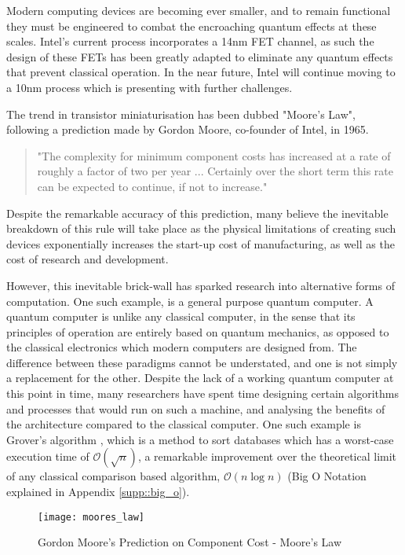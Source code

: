 Modern computing devices are becoming ever smaller, and to remain functional they must be engineered to combat the encroaching quantum effects at these scales. Intel's current process incorporates a 14nm FET channel, as such the design of these FETs has been greatly adapted to eliminate any quantum effects that prevent classical operation. \cite{intel_process} In the near future, Intel will continue moving to a 10nm process which is presenting with further challenges. \cite{intel_future}

The trend in transistor miniaturisation has been dubbed "Moore's Law", following a prediction made by Gordon Moore, co-founder of Intel, in 1965. \cite{moore1965cramming}

\begin{quotation}
	"The complexity for minimum component costs has increased at a rate of roughly a factor of
	 two per year ... Certainly over the short term this rate
	can be expected to continue, if not to increase." 
\end{quotation}
Despite the remarkable accuracy of this prediction, many believe \cite{end_of_Moore_1, end_of_Moore_2} the inevitable breakdown of this rule will take place as the physical limitations of creating such devices exponentially increases the start-up cost of manufacturing, as well as the cost of research and development.

However, this inevitable brick-wall has sparked research into alternative forms of computation. One such example, is a general purpose quantum computer. A quantum computer is unlike any classical computer, in the sense that its principles of operation are entirely based on quantum mechanics, as opposed to the classical electronics which modern computers are designed from. The difference between these paradigms cannot be understated, and one is not simply a replacement for the other. Despite the lack of a working quantum computer at this point in time, many researchers have spent time designing certain algorithms and processes that would run on such a machine, and analysing the benefits of the architecture compared to the classical computer. One such example is Grover's algorithm \cite{grover1996fast}, which is a method to sort databases which has a worst-case execution time of $\mathcal{O}(\sqrt{n})$, a remarkable improvement over the theoretical limit of any classical comparison based algorithm, $\mathcal{O}(n \log{n})$ (Big O Notation explained in Appendix \ref{supp::big_o}).



\begin{figure}[htbp!]
	\centering
	\texttt{[image: moores\_law]}
	\caption{Gordon Moore's Prediction on Component Cost - Moore's Law}
	\label{fig::moores_law}
\end{figure}
